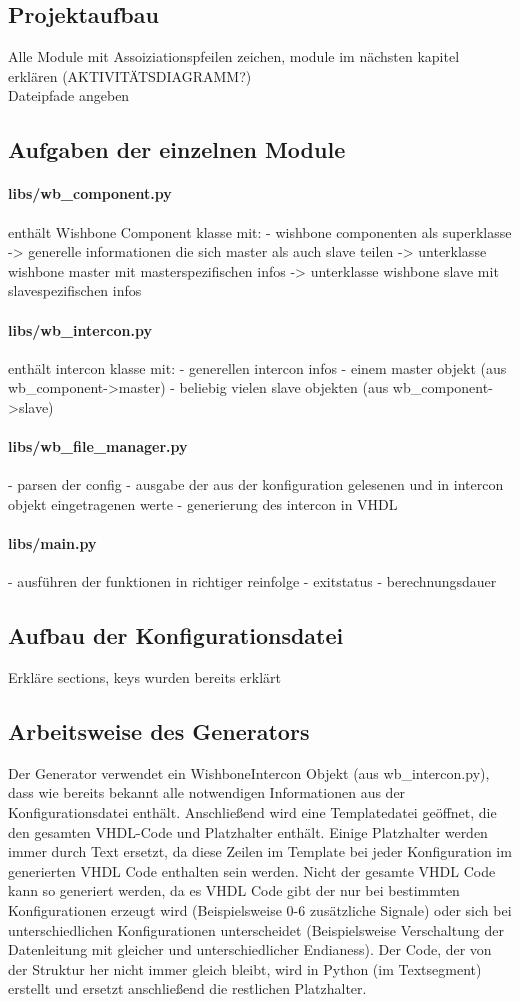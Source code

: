 \documentclass{article}
\begin{document}
\subsection{Projektaufbau}

Alle Module mit Assoiziationspfeilen zeichen, module im nächsten kapitel erklären (AKTIVITÄTSDIAGRAMM?)\\
Dateipfade angeben
\subsection{Aufgaben der einzelnen Module}
\paragraph{libs/wb\_component.py}
enthält Wishbone Component klasse mit:
- wishbone componenten als superklasse
-> generelle informationen die sich master als auch slave teilen
-> unterklasse wishbone master mit masterspezifischen infos
-> unterklasse wishbone slave mit slavespezifischen infos
\paragraph{libs/wb\_intercon.py} 
enthält intercon klasse mit:
- generellen intercon infos
- einem master objekt (aus wb\_component->master)
- beliebig vielen slave objekten (aus wb\_component->slave)
\paragraph{libs/wb\_file\_manager.py} 
- parsen der config
- ausgabe der aus der konfiguration gelesenen und in intercon objekt eingetragenen werte
- generierung des intercon in VHDL
\paragraph{libs/main.py} 
- ausführen der funktionen in richtiger reinfolge
- exitstatus
- berechnungsdauer
\subsection{Aufbau der Konfigurationsdatei}
Erkläre sections, keys wurden bereits erklärt
\subsection{Arbeitsweise des Generators}
Der Generator verwendet ein WishboneIntercon Objekt (aus wb\_intercon.py), dass wie bereits bekannt alle notwendigen Informationen aus der Konfigurationsdatei enthält. Anschließend wird eine Templatedatei geöffnet, die den gesamten VHDL-Code und Platzhalter enthält. Einige Platzhalter werden immer durch Text ersetzt, da diese Zeilen im Template bei jeder Konfiguration im generierten VHDL Code enthalten sein werden. Nicht der gesamte VHDL Code kann so generiert werden, da es VHDL Code gibt der nur bei bestimmten Konfigurationen erzeugt wird (Beispielsweise 0-6 zusätzliche Signale) oder sich bei unterschiedlichen Konfigurationen unterscheidet (Beispielsweise Verschaltung der Datenleitung mit gleicher und unterschiedlicher Endianess). Der Code, der von der Struktur her nicht immer gleich bleibt, wird in Python (im Textsegment) erstellt und ersetzt anschließend die restlichen Platzhalter.
\end{document}
